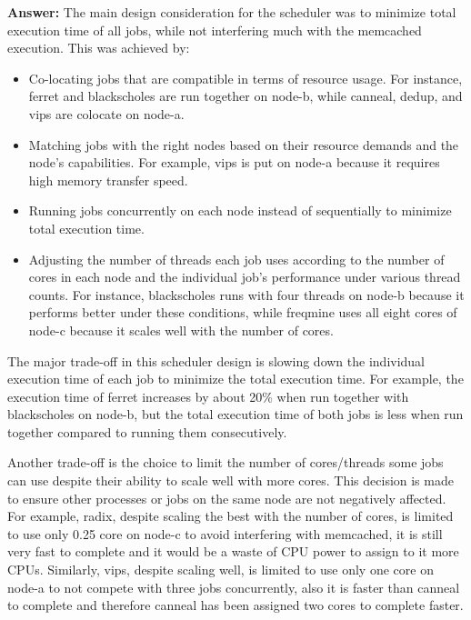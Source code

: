 \begin{enumerate}
\begin{itemize}
        \textbf{Answer:} %
        The main design consideration for the scheduler was to minimize total execution time of all jobs, while not interfering much with the memcached execution. This was achieved by:
        \begin{itemize}
            \item Co-locating jobs that are compatible in terms of resource usage. For instance, ferret and blackscholes are run together on node-b, while canneal, dedup, and vips are colocate on node-a.
            \item Matching jobs with the right nodes based on their resource demands and the node's capabilities. For example, vips is put on node-a because it requires high memory transfer speed.
            \item Running jobs concurrently on each node instead of sequentially to minimize total execution time.
            \item Adjusting the number of threads each job uses according to the number of cores in each node and the individual job's performance under various thread counts. For instance, blackscholes runs with four threads on node-b because it performs better under these conditions, while freqmine uses all eight cores of node-c because it scales well with the number of cores.

        \end{itemize}

        The major trade-off in this scheduler design is slowing down the individual execution time of each job to minimize the total execution time. For example, the execution time of ferret increases by about 20\% when run together with blackscholes on node-b, but the total execution time of both jobs is less when run together compared to running them consecutively.

        Another trade-off is the choice to limit the number of cores/threads some jobs can use despite their ability to scale well with more cores. This decision is made to ensure other processes or jobs on the same node are not negatively affected. For example, radix, despite scaling the best with the number of cores, is limited to use only 0.25 core on node-c to avoid interfering with memcached, it is still very fast to complete and it would be a waste of CPU power to assign to it more CPUs. Similarly, vips, despite scaling well, is limited to use only one core on node-a to not compete with three jobs concurrently, also it is faster than canneal to complete and therefore canneal has been assigned two cores to complete faster.


\end{itemize}
\end{enumerate}
